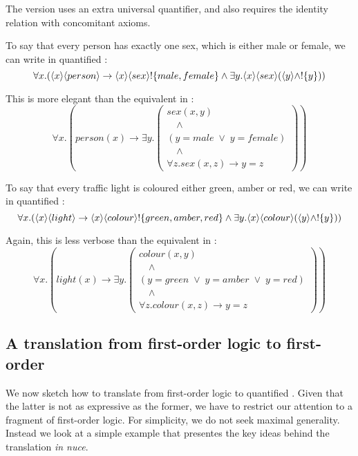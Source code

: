 \NI The \fol{} version uses an extra universal quantifier, and also
requires the identity relation with concomitant axioms.

To say that every person has exactly one sex, which is either male or
female, we can write in quantified \cathoristic{}:
\[
   \forall x . 
      ( \langle x \rangle \langle person \rangle \rightarrow \langle x \rangle \langle sex \rangle !\{male, female\} 
      \land 
      \exists y . \langle x \rangle \langle sex \rangle (\langle y \rangle \land
   ! \{y\}) )
\]

\NI This is more elegant than the equivalent in \fol{}:
\[
   \forall x. ( person(x) \rightarrow \exists y .
   \left(
      \begin{array}{l}
        sex(x,y) \\
        \quad\land\\
        (y = male \; \lor \; y = female)\\ 
        \quad\land\\
        \forall z . sex(x,z) \rightarrow    y = z 
      \end{array}
   \right))
\]

\NI To say that every traffic light is coloured either green, amber or
red, we can write in quantified \cathoristic{}:
\[
   \forall x. (\langle x \rangle \langle light \rangle \rightarrow \langle x \rangle \langle colour \rangle !\{green, amber, red\} \land \exists y . \langle x \rangle \langle colour \rangle (\langle y \rangle \land !\{y\}))
\]

\NI Again, this is less verbose than the equivalent in
\fol{}:
\[
   \forall x. ( light(x) \rightarrow \exists y .
   \left(
      \begin{array}{l}
        colour(x,y) \\
        \quad\land\\
        (y = green \; \lor \; y = amber \; \lor \; y = red) \\
        \quad\land \\
        \forall z . colour(x,z) \rightarrow y = z
      \end{array}
   \right)  )
\]

\subsection{A translation from first-order logic to first-order \cathoristic{}}\label{translationFOLtoFOEL}

We now sketch how to translate from first-order logic to quantified
\cathoristic{}. Given that the latter is not as expressive as the
former, we have to restrict our attention to a fragment of first-order
logic. For simplicity, we do not seek maximal generality. Instead we
look at a simple example that presentes the key ideas behind the
translation \emph{in nuce}.

